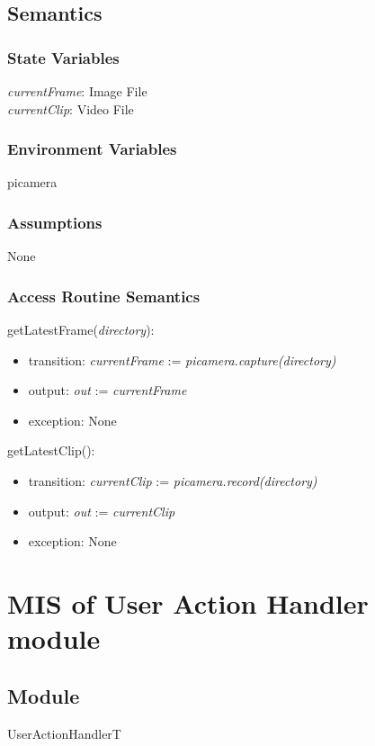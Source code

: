 \documentclass[12pt, titlepage]{article}
\begin{document}
\subsection{Semantics}

\subsubsection{State Variables}
\textit{currentFrame}: Image File \\
\textit{currentClip}: Video File

\subsubsection{Environment Variables}
picamera

\subsubsection{Assumptions}
None

\subsubsection{Access Routine Semantics}

\noindent getLatestFrame(\textit{directory}):
\begin{itemize}
\item transition: \textit{currentFrame} := \textit{picamera.capture(directory)}
\item output: \textit{out} := \textit{currentFrame} 
\item exception: None
\end{itemize}

\noindent getLatestClip():
\begin{itemize}
\item transition: \textit{currentClip} := \textit{picamera.record(directory)}
\item output: \textit{out} := \textit{currentClip} 
\item exception: None
\end{itemize}

\newpage

\section{MIS of User Action Handler module} 
\label{userActionHandler:Module}

\subsection{Module}
UserActionHandlerT
\end{document}
